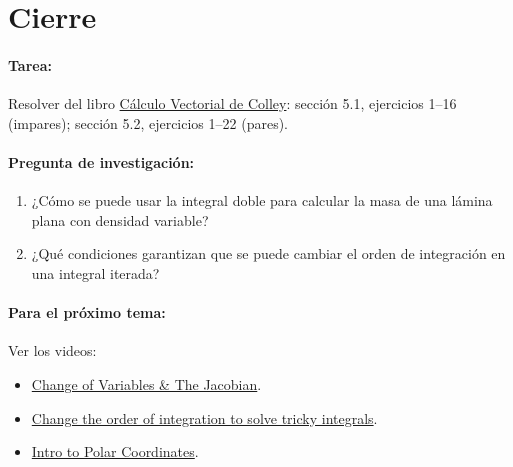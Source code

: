 \documentclass[a4,11pt]{aleph-notas}
\begin{document}
\section*{Cierre}

\paragraph{Tarea:}
Resolver del libro \href{https://catalogobiblioteca.puce.edu.ec/cgi-bin/koha/opac-detail.pl?biblionumber=83405&query_desc=su%3A%22An%C3%A1lisis%20vectorial%22}{Cálculo Vectorial de Colley}: sección 5.1, ejercicios 1--16 (impares); sección 5.2, ejercicios 1--22 (pares).

\paragraph{Pregunta de investigación:}
\begin{enumerate}[leftmargin=*]
    \item ¿Cómo se puede usar la integral doble para calcular la masa de una lámina plana con densidad variable?
    \item ¿Qué condiciones garantizan que se puede cambiar el orden de integración en una integral iterada?
\end{enumerate}

\paragraph{Para el próximo tema:}
Ver los videos:
\begin{itemize}[leftmargin=*]
    \item \href{https://youtu.be/wUF-lyyWpUc?si=bkW6BvU4wMgmxpjL}{Change of Variables \& The Jacobian}.
    \item \href{https://youtu.be/LUvynduoUX0?si=nv4TJNkUkNjgt_pV}{Change the order of integration to solve tricky integrals}.
    \item \href{https://youtu.be/IAb98ZgSJNw?si=RxvzpAw7ys28ySQw}{Intro to Polar Coordinates}.
\end{itemize}
\end{document}
